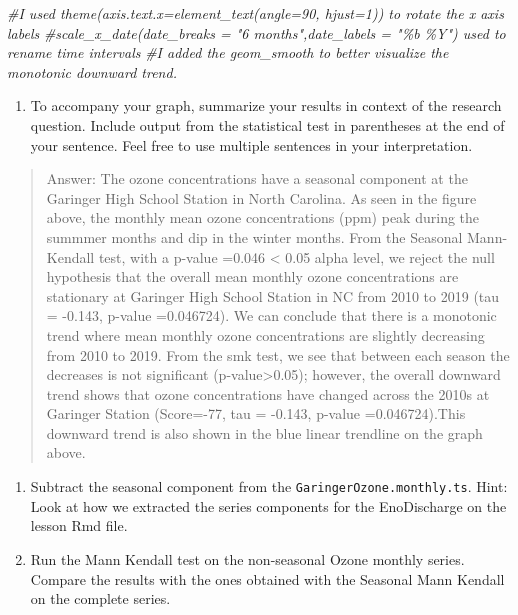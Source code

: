 \documentclass[
]{article}
\newenvironment{Shaded}{\begin{snugshade}}{\end{snugshade}}
\newcommand{\CommentTok}[1]{\textcolor[rgb]{0.56,0.35,0.01}{\textit{#1}}}
\providecommand{\tightlist}{%
  \setlength{\itemsep}{0pt}\setlength{\parskip}{0pt}}
\begin{document}
\begin{Shaded}
\begin{Highlighting}[]
\CommentTok{\#I used theme(axis.text.x=element\_text(angle=90, hjust=1)) to rotate the x axis labels}
\CommentTok{\#scale\_x\_date(date\_breaks = "6 months",date\_labels = "\%b \%Y") used to rename time intervals}
\CommentTok{\#I added the geom\_smooth to better visualize the monotonic downward trend. }
\end{Highlighting}
\end{Shaded}

\begin{enumerate}
\def\labelenumi{\arabic{enumi}.}
\setcounter{enumi}{13}
\tightlist
\item
  To accompany your graph, summarize your results in context of the
  research question. Include output from the statistical test in
  parentheses at the end of your sentence. Feel free to use multiple
  sentences in your interpretation.
\end{enumerate}

\begin{quote}
Answer: The ozone concentrations have a seasonal component at the
Garinger High School Station in North Carolina. As seen in the figure
above, the monthly mean ozone concentrations (ppm) peak during the
summmer months and dip in the winter months. From the Seasonal
Mann-Kendall test, with a p-value =0.046 \textless{} 0.05 alpha level,
we reject the null hypothesis that the overall mean monthly ozone
concentrations are stationary at Garinger High School Station in NC from
2010 to 2019 (tau = -0.143, p-value =0.046724). We can conclude that
there is a monotonic trend where mean monthly ozone concentrations are
slightly decreasing from 2010 to 2019. From the smk test, we see that
between each season the decreases is not significant
(p-value\textgreater0.05); however, the overall downward trend shows
that ozone concentrations have changed across the 2010s at Garinger
Station (Score=-77, tau = -0.143, p-value =0.046724).This downward trend
is also shown in the blue linear trendline on the graph above.
\end{quote}

\begin{enumerate}
\def\labelenumi{\arabic{enumi}.}
\setcounter{enumi}{14}
\item
  Subtract the seasonal component from the
  \texttt{GaringerOzone.monthly.ts}. Hint: Look at how we extracted the
  series components for the EnoDischarge on the lesson Rmd file.
\item
  Run the Mann Kendall test on the non-seasonal Ozone monthly series.
  Compare the results with the ones obtained with the Seasonal Mann
  Kendall on the complete series.
\end{enumerate}
\end{document}
